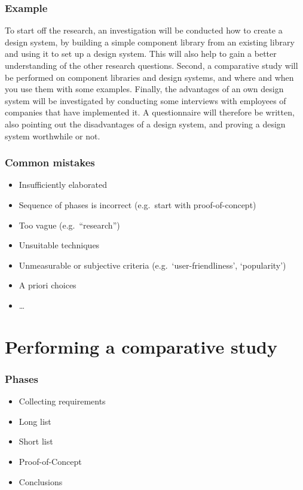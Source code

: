 \documentclass[aspectratio=169]{beamer}
\begin{document}
\begin{frame}
  \frametitle{Example}
  \small
  To start off the research, an investigation will be conducted how to create a design system, by building a simple component library from an existing library and using it to set up a design system. This will also help to gain a better understanding of the other research questions. Second, a comparative study will be performed on component libraries and design systems, and where and when you use them with some examples. Finally, the advantages of an own design system will be investigated by conducting some interviews with employees of companies that have implemented it. A questionnaire will therefore be written, also pointing out the disadvantages of a design system, and proving a design system worthwhile or not.   

\end{frame}

\begin{frame}
  \frametitle{Common mistakes}

  \begin{itemize}
      \item Insufficiently elaborated
      \item Sequence of phases is incorrect (e.g.\ start with proof-of-concept)
      \item Too vague (e.g.\ ``research'')
      \item Unsuitable techniques
      \item Unmeasurable or subjective criteria (e.g.\ `user-friendliness', `popularity')
      \item A priori choices
      \item \ldots
  \end{itemize}

\end{frame}

\section{Performing a comparative study}

\begin{frame}
  \frametitle{Phases}


  \begin{itemize}
    \item Collecting requirements     
    \item Long list
    \item Short list
    \item Proof-of-Concept
    \item Conclusions
  \end{itemize}

\end{frame}
\end{document}
